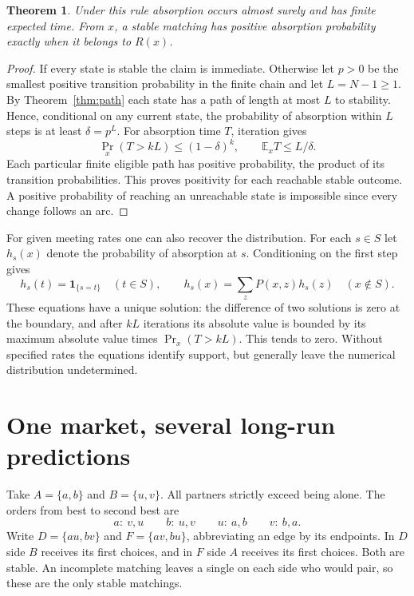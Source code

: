 \documentclass[11pt]{article}
\newtheorem{theorem}{Theorem}
\begin{document}
\begin{theorem}\label{thm:random}
Under this rule absorption occurs almost surely and has finite expected time. From \(x\), a stable matching has positive absorption probability exactly when it belongs to \(R(x)\).
\end{theorem}

\begin{proof}
If every state is stable the claim is immediate. Otherwise let \(p>0\) be the smallest positive transition probability in the finite chain and let \(L=N-1\geq1\). By Theorem~\ref{thm:path} each state has a path of length at most \(L\) to stability. Hence, conditional on any current state, the probability of absorption within \(L\) steps is at least \(\delta=p^L\). For absorption time \(T\), iteration gives
\[
 \Pr_x(T>kL)\leq (1-\delta)^k,\qquad
 \mathbb E_x T\leq L/\delta .
\]
Each particular finite eligible path has positive probability, the product of its transition probabilities. This proves positivity for each reachable stable outcome. A positive probability of reaching an unreachable state is impossible since every change follows an arc.
\end{proof}

For given meeting rates one can also recover the distribution. For each \(s\in S\) let \(h_s(x)\) denote the probability of absorption at \(s\). Conditioning on the first step gives
\[
 h_s(t)=\mathbf{1}_{\{s=t\}}\quad(t\in S),\qquad
 h_s(x)=\sum_z P(x,z)h_s(z)\quad(x\notin S).
\]
These equations have a unique solution: the difference of two solutions is zero at the boundary, and after \(kL\) iterations its absolute value is bounded by its maximum absolute value times \(\Pr_x(T>kL)\). This tends to zero. Without specified rates the equations identify support, but generally leave the numerical distribution undetermined.

\section{One market, several long-run predictions}\label{sec:example}

Take \(A=\{a,b\}\) and \(B=\{u,v\}\). All partners strictly exceed being alone. The orders from best to second best are
\[
 a:\ v,u \qquad b:\ u,v \qquad u:\ a,b \qquad v:\ b,a .
\]
Write \(D=\{au,bv\}\) and \(F=\{av,bu\}\), abbreviating an edge by its endpoints. In \(D\) side \(B\) receives its first choices, and in \(F\) side \(A\) receives its first choices. Both are stable. An incomplete matching leaves a single on each side who would pair, so these are the only stable matchings.
\end{document}
